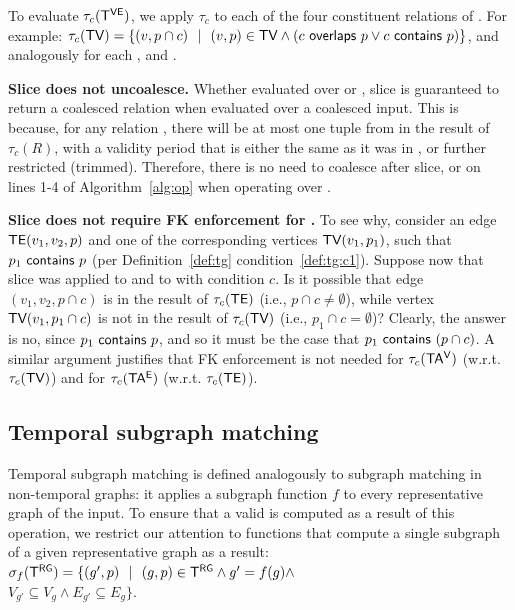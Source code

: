 To evaluate $\tau_c (\mathsf{T^{VE}})$, we apply $\tau_c$ to each of the four
constituent relations of \tve.  For example: 
$\tau_c (\textsf{TV}) = \{ (v, p
\cap c)~~|~~(v, p) \in \textsf{TV} \wedge (c~\mathsf{overlaps}~p \vee c~\mathsf{contains}~p) \}$, 
and analogously for each \te, \tav and \tae.



{\bf Slice does not uncoalesce.} Whether evaluated over \trg or \tve,
slice is guaranteed to return a coalesced relation when evaluated over
a coalesced input.  This is because, for any relation , there
will be at most one tuple from  in the result of $\tau_c (R)$,
with a validity period that is either the same as it was in ,
or further restricted (trimmed).  Therefore, there is no need to
coalesce \trg after slice, or on lines 1-4 of Algorithm~\ref{alg:op}
when operating over \tve.

{\bf Slice does not require FK enforcement for \tve.}  To see why,
consider an edge $\textsf{TE}(v_1, v_2, p)$ and one of the corresponding
vertices $\textsf{TV}(v_1, p_1)$, such that $p_1~\mathsf{contains}~p$ (per
Definition~\ref{def:tg} condition~\ref{def:tg:c1}).  Suppose now that
slice was applied to \tv and to \te with condition $c$.  Is it
possible that edge $(v_1, v_2, p \cap c)$ is in the result of $\tau_c
(\textsf{TE})$ (i.e., $p \cap c \neq \emptyset$), while vertex $\textsf{TV}(v_1, p_1 \cap
c)$ is not in the result of $\tau_c (\textsf{TV})$ (i.e., $p_1 \cap c =
\emptyset$)?  Clearly, the answer is no, since
$p_1~\mathsf{contains}~p$, and so it must be the case that
$p_1~\mathsf{contains}~(p \cap c)$.  A similar argument justifies that
FK enforcement is not needed for $\tau_c(\mathsf{TA^{V}})$ (w.r.t. $\tau_c (\textsf{TV})$) and
for $\tau_c(\mathsf{TA^{E}})$ (w.r.t. $\tau_c (\textsf{TE})$).

\subsection{Temporal subgraph matching}
\label{sec:algebra:subgraph}

Temporal subgraph matching is defined analogously to subgraph matching
in non-temporal graphs: it applies a subgraph function $f$ to every
representative graph of the input.  To ensure that a valid \tg is
computed as a result of this operation, we restrict our attention to
functions that compute a single subgraph of a given representative
graph as a result: $\sigma_f (\mathsf{T^{RG}}) = \{ (g', p)~~|~~(g, p) \in \mathsf{T^{RG}}
\wedge g' = f(g) \wedge$\\$V_{g'} \subseteq V_{g} \wedge E_{g'}
\subseteq E_{g} \}$.

